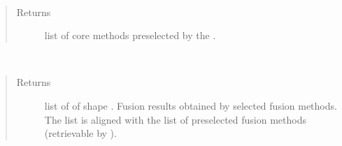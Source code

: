 \documentclass[letterpaper,10pt,english]{sphinxmanual}
\begin{document}
\begin{fulllineitems}
\begin{fulllineitems}
\begin{quote}
\begin{description}
\end{description}\end{quote}

\end{fulllineitems}


\begin{fulllineitems}
\label{\detokenize{pusion.auto.auto_combiner:pusion.auto.auto_combiner.AutoCombiner.get_combiners}}~\begin{quote}\begin{description}
\item[{Returns}] \leavevmode
\sphinxAtStartPar
list of core methods preselected by the .

\end{description}\end{quote}

\end{fulllineitems}


\begin{fulllineitems}
\label{\detokenize{pusion.auto.auto_combiner:pusion.auto.auto_combiner.AutoCombiner.get_multi_combiner_decision_tensor}}~\begin{quote}\begin{description}
\item[{Returns}] \leavevmode
\sphinxAtStartPar
list of  of shape .
Fusion results obtained by selected fusion methods.
The list is aligned with the list of preselected fusion methods (retrievable by ).

\end{description}\end{quote}

\end{fulllineitems}



\end{fulllineitems}
\end{document}
